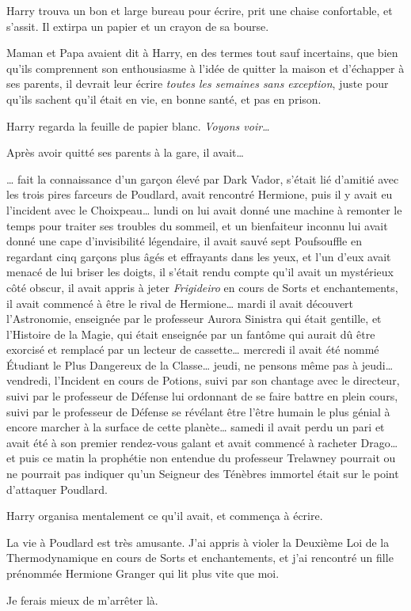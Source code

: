 Harry trouva un bon et large bureau pour écrire, prit une chaise confortable, et s'assit. Il extirpa un papier et un crayon de sa bourse.

Maman et Papa avaient dit à Harry, en des termes tout sauf incertains, que bien qu'ils comprennent son enthousiasme à l'idée de quitter la maison et d'échapper à ses parents, il devrait leur écrire \emph{toutes les semaines sans exception}, juste pour qu'ils sachent qu'il était en vie, en bonne santé, et pas en prison.

Harry regarda la feuille de papier blanc. \emph{Voyons voir…}

Après avoir quitté ses parents à la gare, il avait…

… fait la connaissance d'un garçon élevé par Dark Vador, s'était lié d'amitié avec les trois pires farceurs de Poudlard, avait rencontré Hermione, puis il y avait eu l'incident avec le Choixpeau… lundi on lui avait donné une machine à remonter le temps pour traiter ses troubles du sommeil, et un bienfaiteur inconnu lui avait donné une cape d'invisibilité légendaire, il avait sauvé sept Poufsouffle en regardant cinq garçons plus âgés et effrayants dans les yeux, et l'un d'eux avait menacé de lui briser les doigts, il s'était rendu compte qu'il avait un mystérieux côté obscur, il avait appris à jeter \emph{Frigideiro} en cours de Sorts et enchantements, il avait commencé à être le rival de Hermione… mardi il avait découvert l'Astronomie, enseignée par le professeur Aurora Sinistra qui était gentille, et l'Histoire de la Magie, qui était enseignée par un fantôme qui aurait dû être exorcisé et remplacé par un lecteur de cassette… mercredi il avait été nommé Étudiant le Plus Dangereux de la Classe… jeudi, ne pensons même pas à jeudi… vendredi, l'Incident en cours de Potions, suivi par son chantage avec le directeur, suivi par le professeur de Défense lui ordonnant de se faire battre en plein cours, suivi par le professeur de Défense se révélant être l'être humain le plus génial à encore marcher à la surface de cette planète… samedi il avait perdu un pari et avait été à son premier rendez-vous galant et avait commencé à racheter Drago… et puis ce matin la prophétie non entendue du professeur Trelawney pourrait ou ne pourrait pas indiquer qu'un Seigneur des Ténèbres immortel était sur le point d'attaquer Poudlard.

Harry organisa mentalement ce qu'il avait, et commença à écrire.
\begin{writtenNote}

La vie à Poudlard est très amusante. J'ai appris à violer la Deuxième Loi de la Thermodynamique en cours de Sorts et enchantements, et j'ai rencontré un fille prénommée Hermione Granger qui lit plus vite que moi.

Je ferais mieux de m'arrêter là.

\end{writtenNote}

